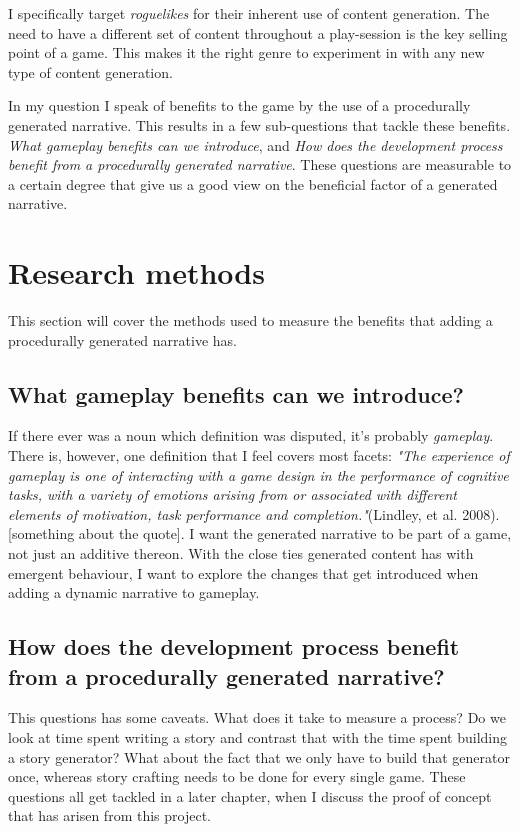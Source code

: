 I specifically target \textit{roguelikes} for their inherent use of content generation. The need to have a different set of content throughout a play-session is the key selling point of a \rogue game. This makes it the right genre to experiment in with any new type of content generation.

In my question I speak of benefits to the game by the use of a procedurally generated narrative. This results in a few sub-questions that tackle these benefits. \textit{What gameplay benefits can we introduce}, and \textit{How does the development process benefit from a procedurally generated narrative}. These questions are measurable to a certain degree that give us a good view on the beneficial factor of a generated narrative.

\section{Research methods}
This section will cover the methods used to measure the benefits that adding a procedurally generated narrative has.

\subsection{What gameplay benefits can we introduce?}
If there ever was a noun which definition was disputed, it's probably \textit{gameplay}. There is, however, one definition that I feel covers most facets: \textit{"The experience of gameplay is one of interacting with a game design in the performance of cognitive tasks, with a variety of emotions arising from or associated with different elements of motivation, task performance and completion."}(Lindley, et al. 2008). [something about the quote].
I want the generated narrative to be part of a game, not just an additive thereon. With the close ties generated content has with emergent behaviour, I want to explore the changes that get introduced when adding a dynamic narrative to gameplay.

\subsection{How does the development process benefit from a procedurally generated narrative?}
This questions has some caveats. What does it take to measure a process? Do we look at time spent writing a story and contrast that with the time spent building a story generator? What about the fact that we only have to build that generator once, whereas story crafting needs to be done for every single game. These questions all get tackled in a later chapter, when I discuss the proof of concept that has arisen from this project.

